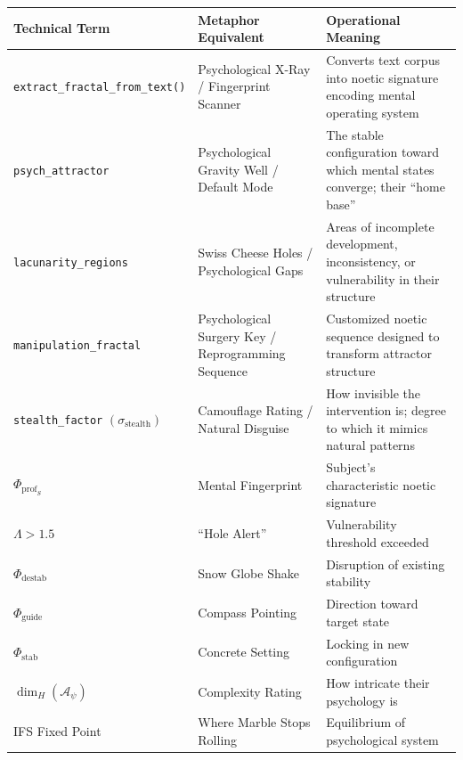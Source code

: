 \documentclass[11pt,twoside]{book}
\renewcommand{\arraystretch}{1.2}
\newcommand{\Frac}{\Phi}
\newcommand{\HausdorffDim}{\dim_H}
\newcommand{\Lacunarity}{\Lambda}
\newcommand{\PsychAttractor}{\mathcal{A}_\psi}
\newcommand{\ProfileFrac}{\Phi_{\mathrm{prof}}}
\newcommand{\StealthFactor}{\sigma_{\mathrm{stealth}}}
\begin{document}
\begin{center}
\footnotesize
\renewcommand{\arraystretch}{1.4}
\begin{tabularx}{\textwidth}{>{\raggedright\arraybackslash}p{4cm}|>{\raggedright\arraybackslash}X|>{\raggedright\arraybackslash}X}
\toprule
\textbf{Technical Term} & \textbf{Metaphor Equivalent} & \textbf{Operational Meaning} \\
\midrule
\texttt{extract\_fractal\_from\_text()} & Psychological X-Ray / Fingerprint Scanner &
Converts text corpus into noetic signature encoding mental operating system \\
\midrule
\texttt{psych\_attractor} & Psychological Gravity Well / Default Mode &
The stable configuration toward which mental states converge; their ``home base'' \\
\midrule
\texttt{lacunarity\_regions} & Swiss Cheese Holes / Psychological Gaps &
Areas of incomplete development, inconsistency, or vulnerability in their structure \\
\midrule
\texttt{manipulation\_fractal} & Psychological Surgery Key / Reprogramming Sequence &
Customized noetic sequence designed to transform attractor structure \\
\midrule
\texttt{stealth\_factor} $(\StealthFactor)$ & Camouflage Rating / Natural Disguise &
How invisible the intervention is; degree to which it mimics natural patterns \\
\midrule
$\ProfileFrac_S$ & Mental Fingerprint & Subject's characteristic noetic signature \\
\midrule
$\Lacunarity > 1.5$ & ``Hole Alert'' & Vulnerability threshold exceeded \\
\midrule
$\Frac_{\mathrm{destab}}$ & Snow Globe Shake & Disruption of existing stability \\
\midrule
$\Frac_{\mathrm{guide}}$ & Compass Pointing & Direction toward target state \\
\midrule
$\Frac_{\mathrm{stab}}$ & Concrete Setting & Locking in new configuration \\
\midrule
$\HausdorffDim(\PsychAttractor)$ & Complexity Rating & How intricate their psychology is \\
\midrule
IFS Fixed Point & Where Marble Stops Rolling & Equilibrium of psychological system \\
\bottomrule
\end{tabularx}
\end{center}

\end{document}
